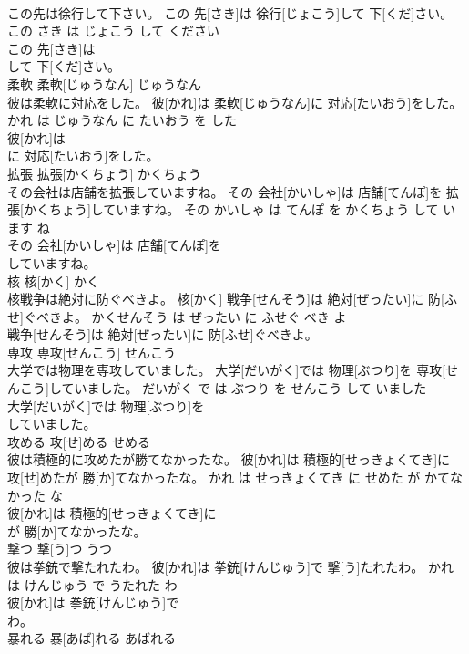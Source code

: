 \documentclass[8pt]{extreport}
\begin{document}
\begin{CJK}{UTF8}{min}
\\	この先は徐行して下さい。	この 先[さき]は 徐行[じょこう]して 下[くだ]さい。	この さき は じょこう して ください	
\\	この 先[さき]は
\\	して 下[くだ]さい。			
\\	柔軟	柔軟[じゅうなん]	じゅうなん	
\\	彼は柔軟に対応をした。	彼[かれ]は 柔軟[じゅうなん]に 対応[たいおう]をした。	かれ は じゅうなん に たいおう を した	
\\	彼[かれ]は
\\	に 対応[たいおう]をした。			
\\	拡張	拡張[かくちょう]	かくちょう	
\\	その会社は店舗を拡張していますね。	その 会社[かいしゃ]は 店舗[てんぽ]を 拡張[かくちょう]していますね。	その かいしゃ は てんぽ を かくちょう して います ね	
\\	その 会社[かいしゃ]は 店舗[てんぽ]を
\\	していますね。			
\\	核	核[かく]	かく	
\\	核戦争は絶対に防ぐべきよ。	核[かく] 戦争[せんそう]は 絶対[ぜったい]に 防[ふせ]ぐべきよ。	かくせんそう は ぜったい に ふせぐ べき よ	
\\	戦争[せんそう]は 絶対[ぜったい]に 防[ふせ]ぐべきよ。			
\\	専攻	専攻[せんこう]	せんこう	
\\	大学では物理を専攻していました。	大学[だいがく]では 物理[ぶつり]を 専攻[せんこう]していました。	だいがく で は ぶつり を せんこう して いました	
\\	大学[だいがく]では 物理[ぶつり]を
\\	していました。			
\\	攻める	攻[せ]める	せめる	
\\	彼は積極的に攻めたが勝てなかったな。	彼[かれ]は 積極的[せっきょくてき]に 攻[せ]めたが 勝[か]てなかったな。	かれ は せっきょくてき に せめた が かてなかった な	
\\	彼[かれ]は 積極的[せっきょくてき]に
\\	が 勝[か]てなかったな。			
\\	撃つ	撃[う]つ	うつ	
\\	彼は拳銃で撃たれたわ。	彼[かれ]は 拳銃[けんじゅう]で 撃[う]たれたわ。	かれ は けんじゅう で うたれた わ	
\\	彼[かれ]は 拳銃[けんじゅう]で
\\	わ。			
\\	暴れる	暴[あば]れる	あばれる	

\end{CJK}
\end{document}
